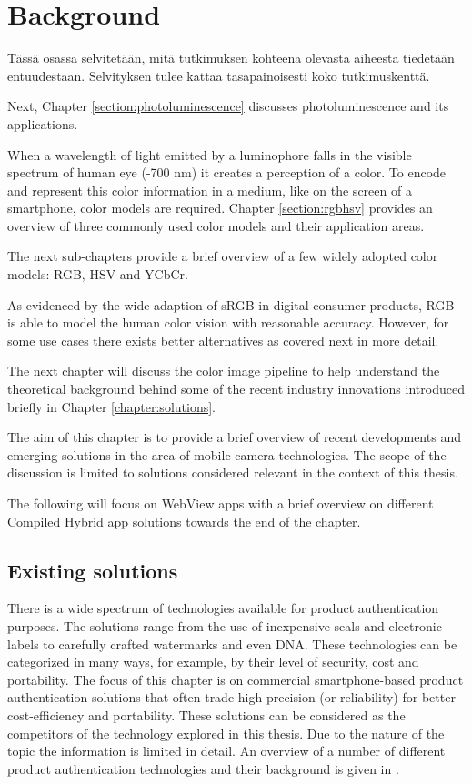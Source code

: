 \documentclass[thesis.tex]{subfiles}
\begin{document}
\chapter{Background}
\label{chapter:background}

Tässä osassa selvitetään, mitä tutkimuksen kohteena olevasta aiheesta tiedetään entuudestaan. Selvityksen tulee kattaa tasapainoisesti koko tutkimuskenttä.

Next, Chapter \ref{section:photoluminescence} discusses photoluminescence and its applications.

When a wavelength of light emitted by a luminophore falls in the visible spectrum of human eye (-700 nm) it creates a perception of a color. To encode and represent this color information in a medium, like on the screen of a smartphone, color models are required. Chapter \ref{section:rgbhsv} provides an overview of three commonly used color models and their application areas.

The next sub-chapters provide a brief overview of a few widely adopted color models: RGB, HSV and YCbCr.

As evidenced by the wide adaption of sRGB in digital consumer products, RGB is able to model the human color vision with reasonable accuracy. However, for some use cases there exists better alternatives as covered next in more detail.

The next chapter will discuss the color image pipeline to help understand the theoretical background behind some of the recent industry innovations introduced briefly in Chapter \ref{chapter:solutions}.

The aim of this chapter is to provide a brief overview of recent developments and emerging solutions in the area of mobile camera technologies. The scope of the discussion is limited to solutions considered relevant in the context of this thesis.

The following will focus on WebView apps with a brief overview on different Compiled Hybrid app solutions towards the end of the chapter.
\clearpage

\section{Existing solutions}

There is a wide spectrum of technologies available for product authentication purposes. The solutions range from the use of inexpensive seals and electronic labels to carefully crafted watermarks and even DNA. These technologies can be categorized in many ways, for example, by their level of security, cost and portability. The focus of this chapter is on commercial smartphone-based product authentication solutions that often trade high precision (or reliability) for better cost-efficiency and portability. These solutions can be considered as the competitors of the technology explored in this thesis. Due to the nature of the topic the information is limited in detail. An overview of a number of different product authentication technologies and their background is given in \cite{kuosmanen}.
\end{document}
